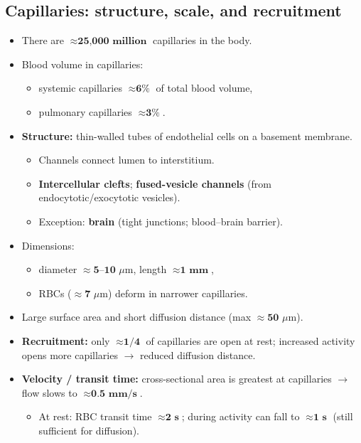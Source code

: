 \documentclass[11pt,a4paper]{article}
\begin{document}
\subsection{Capillaries: structure, scale, and recruitment}
\begin{itemize}
\item There are $\approx \textbf{25{,}000 million}$ capillaries in the body.
\item Blood volume in capillaries:
  \begin{itemize}
  \item systemic capillaries $\approx \textbf{6\%}$ of total blood volume,
  \item pulmonary capillaries $\approx \textbf{3\%}$.
  \end{itemize}
\item \textbf{Structure:} thin-walled tubes of endothelial cells on a basement membrane.
  \begin{itemize}
  \item Channels connect lumen to interstitium.
  \item \textbf{Intercellular clefts}; \textbf{fused-vesicle channels} (from endocytotic/exocytotic vesicles).
  \item Exception: \textbf{brain} (tight junctions; blood--brain barrier).
  \end{itemize}
\item Dimensions:
  \begin{itemize}
  \item diameter $\approx \textbf{5--10 }\mu\mathrm{m}$, length $\approx \textbf{1 mm}$,
  \item RBCs ($\approx \textbf{7 }\mu\mathrm{m}$) deform in narrower capillaries.
  \end{itemize}
\item Large surface area and short diffusion distance (max $\approx \textbf{50 }\mu\mathrm{m}$).
\item \textbf{Recruitment:} only $\approx \textbf{1/4}$ of capillaries are open at rest; increased activity opens more capillaries $\rightarrow$ reduced diffusion distance.
\item \textbf{Velocity / transit time:} cross-sectional area is greatest at capillaries $\rightarrow$ flow slows to $\approx \textbf{0.5 mm/s}$.
  \begin{itemize}
  \item At rest: RBC transit time $\approx \textbf{2 s}$; during activity can fall to $\approx \textbf{1 s}$ (still sufficient for diffusion).
  \end{itemize}
\end{itemize}
\end{document}
